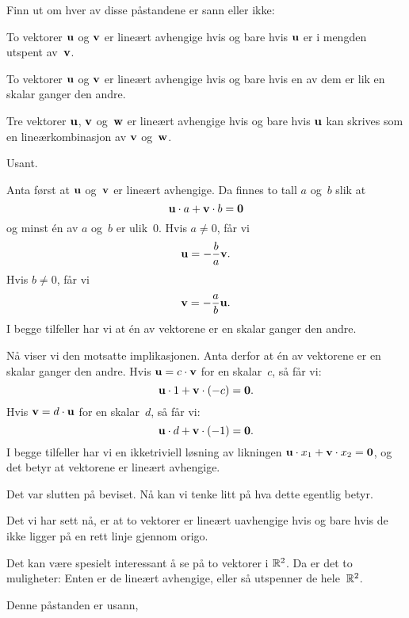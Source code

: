 \begin{oppgave}
Finn ut om hver av disse påstandene er sann eller ikke:
\begin{punkt}
To vektorer $\mathbf{u}$ og $\mathbf{v}$ er lineært avhengige hvis og bare hvis $\mathbf{u}$
er i mengden utspent av~$\mathbf{v}$.
\end{punkt}
\begin{punkt}
To vektorer $\mathbf{u}$ og $\mathbf{v}$ er lineært avhengige hvis og bare hvis en av
dem er lik en skalar ganger den andre.
\end{punkt}
\begin{punkt}
Tre vektorer $\mathbf{u}$, $\mathbf{v}$ og~$\mathbf{w}$ er lineært avhengige hvis og bare
hvis $\mathbf{u}$ kan skrives som en lineærkombinasjon av $\mathbf{v}$ og~$\mathbf{w}$.
\end{punkt}
\end{oppgave}

\begin{losning}
\begin{punkt}
Usant.%
\end{punkt}

\begin{punkt}
Anta først at $\mathbf{u}$ og~$\mathbf{v}$ er lineært avhengige.  Da finnes
to tall $a$ og~$b$ slik at
\[
\mathbf{u} \cdot a + \mathbf{v} \cdot b = \mathbf{0}
\]
og minst én av $a$ og~$b$ er ulik~$0$.  Hvis $a \ne 0$, får vi
\[
\mathbf{u} = - \frac{b}{a} \mathbf{v}.
\]
Hvis $b \ne 0$, får vi
\[
\mathbf{v} = - \frac{a}{b} \mathbf{u}.
\]
I begge tilfeller har vi at én av vektorene er en skalar ganger den
andre.

Nå viser vi den motsatte implikasjonen.  Anta derfor at én av vektorene
er en skalar ganger den andre.  Hvis $\mathbf{u} = c \cdot \mathbf{v}$ for en
skalar~$c$, så får vi:
\[
\mathbf{u} \cdot 1 + \mathbf{v} \cdot (-c) = \mathbf{0}.
\]
Hvis $\mathbf{v} = d \cdot \mathbf{u}$ for en skalar~$d$, så får vi:
\[
\mathbf{u} \cdot d + \mathbf{v} \cdot (-1) = \mathbf{0}.
\]
I begge tilfeller har vi en ikketriviell løsning av likningen
$\mathbf{u} \cdot x_1 + \mathbf{v} \cdot x_2 = \mathbf{0}$,
og det betyr at vektorene er lineært avhengige.

Det var slutten på beviset.  Nå kan vi tenke litt på hva dette
egentlig betyr.

Det vi har sett nå, er at to vektorer er lineært uavhengige hvis og
bare hvis de ikke ligger på en rett linje gjennom origo.

Det kan være spesielt interessant å se på to vektorer i $\mathbb{R}^2$.  Da er
det to muligheter: Enten er de lineært avhengige, eller så utspenner
de hele~$\mathbb{R}^2$.
\end{punkt}

\begin{punkt}
Denne påstanden er usann,%
\end{punkt}
\end{losning}


